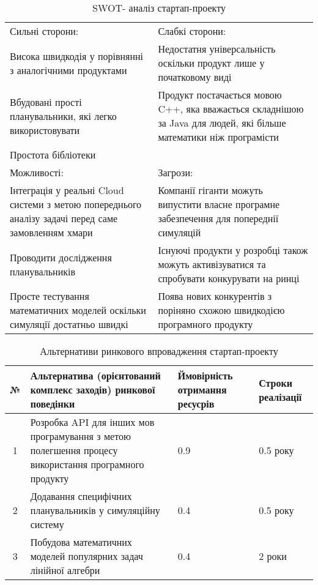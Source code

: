 \begin{table}[H]
	\centering
	\begin{tabular}{|p{5cm}|p{5cm}|}
		\hline
		Сильні сторони: & Слабкі сторони:
		\\
		
		\tabitem Висока швидкодія у порівнянні з аналогічними продуктами & \tabitem Недостатня універсальність оскільки продукт лише у початковому виді
		\\
		\tabitem Вбудовані прості планувальники, які легко використовувати & \tabitem Продукт постачається мовою C++, яка вважається складнішою за Java для людей, які більше  математики ніж програмісти
		\\
		\tabitem Простота бібліотеки & 
		\\ \hline
		
		Можливості: & Загрози:
		\\
		\tabitem Інтеграція у реальні Cloud системи з метою попереднього аналізу задачі перед саме замовленням хмари & \tabitem Компанії гіганти можуть випустити власне програмне забезпечення для попереднії симуляцій
		\\
		\tabitem Проводити дослідження планувальників & \tabitem Існуючі продукти у розробці також можуть активізуватися та спробувати конкурувати на ринці
		\\
		\tabitem Просте тестування математичних моделей оскільки симуляції достатньо швидкі & \tabitem Поява нових конкурентів з поріняно схожою швидкодією програмного продукту
		\\ \hline
		
	\end{tabular}
	\caption{SWOT- аналіз стартап-проекту}
\end{table}

\begin{table}[H]
	\centering
	\begin{tabular}{|c|p{4cm}|p{4cm}|p{4cm}|} \hline
		№
		& Альтернатива (орієнтований комплекс заходів) ринкової поведінки
		& Ймовірність отримання ресусрів & Строки реалізації
		\\ \hline
		
		1
		& Розробка API для інших мов програмування з метою полегшення процесу використання програмного продукту
		& 0.9
		& 0.5 року
		\\ \hline
		
		2
		& Додавання специфічних планувальників у симуляційну систему
		& 0.4
		& 0.5 року
		\\ \hline
		
		3
		& Побудова математичних моделей популярних задач лінійної алгебри
		& 0.4
		& 2 роки
		\\ \hline
	\end{tabular}
	\caption{Альтернативи ринкового впровадження стартап-проекту}
\end{table}
\pagebreak[4]

